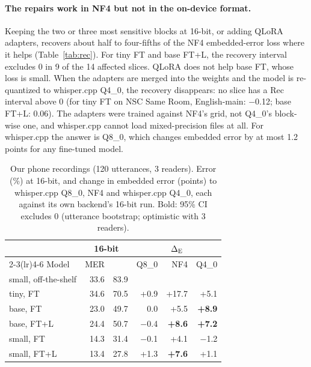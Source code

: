 \paragraph{The repairs work in NF4 but not in the on-device format.}
Keeping the two or three most sensitive blocks at 16-bit, or adding QLoRA adapters, recovers about half to four-fifths of the NF4 embedded-error loss where it helps (Table~\ref{tab:rec}). For tiny FT and base FT+L, the recovery interval excludes 0 in 9 of the 14 affected slices. QLoRA does not help base FT, whose loss is small. When the adapters are merged into the weights and the model is re-quantized to whisper.cpp Q4\_0, the recovery disappears: no slice has a Rec interval above 0 (for tiny FT on NSC Same Room, English-main: $-$0.12; base FT+L: 0.06). The adapters were trained against NF4's grid, not Q4\_0's block-wise one, and whisper.cpp cannot load mixed-precision files at all. For whisper.cpp the answer is Q8\_0, which changes embedded error by at most 1.2 points for any fine-tuned model.


\begin{table}[t]
\centering
\small
\setlength{\tabcolsep}{3.5pt}
\begin{tabular}{lrrrrr}
\toprule
 & \multicolumn{2}{c}{16-bit} & \multicolumn{3}{c}{$\Delta_{\textsc{E}}$} \\
\cmidrule(lr){2-3}\cmidrule(lr){4-6}
Model & MER & \Emb{} & Q8\_0 & NF4 & Q4\_0 \\
\midrule
small, off-the-shelf & 33.6 & 83.9 & & & \\
tiny, FT & 34.6 & 70.5 & +0.9 & +17.7 & +5.1 \\
base, FT & 23.0 & 49.7 & 0.0 & +5.5 & \textbf{+8.9} \\
base, FT+L & 24.4 & 50.7 & $-$0.4 & \textbf{+8.6} & \textbf{+7.2} \\
small, FT & 14.3 & 31.4 & $-$0.1 & +4.1 & $-$1.2 \\
small, FT+L & 13.4 & 27.8 & +1.3 & \textbf{+7.6} & +1.1 \\
\bottomrule
\end{tabular}
\caption{Our phone recordings (120 utterances, 3 readers). Error (\%) at 16-bit, and change in embedded error (points) to whisper.cpp Q8\_0, NF4 and whisper.cpp Q4\_0, each against its own backend's 16-bit run. Bold: 95\% CI excludes 0 (utterance bootstrap; optimistic with 3 readers).}
\label{tab:human}
\end{table}

